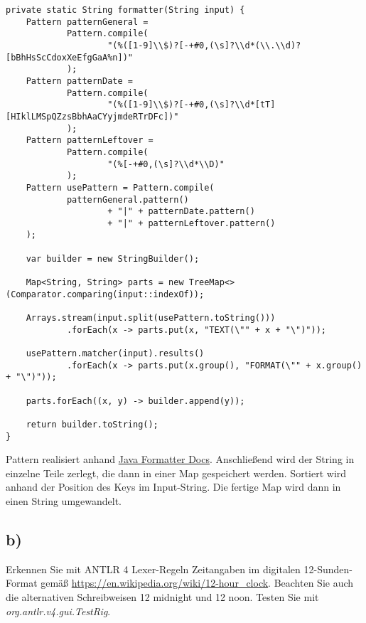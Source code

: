 \begin{lstlisting}[label={lst:Aufgabe1a}]
private static String formatter(String input) {
    Pattern patternGeneral =
            Pattern.compile(
                    "(%([1-9]\\$)?[-+#0,(\s]?\\d*(\\.\\d)?[bBhHsScCdoxXeEfgGaA%n])"
            );
    Pattern patternDate =
            Pattern.compile(
                    "(%([1-9]\\$)?[-+#0,(\s]?\\d*[tT][HIklLMSpQZzsBbhAaCYyjmdeRTrDFc])"
            );
    Pattern patternLeftover =
            Pattern.compile(
                    "(%[-+#0,(\s]?\\d*\\D)"
            );
    Pattern usePattern = Pattern.compile(
            patternGeneral.pattern()
                    + "|" + patternDate.pattern()
                    + "|" + patternLeftover.pattern()
    );

    var builder = new StringBuilder();

    Map<String, String> parts = new TreeMap<>(Comparator.comparing(input::indexOf));

    Arrays.stream(input.split(usePattern.toString()))
            .forEach(x -> parts.put(x, "TEXT(\"" + x + "\")"));

    usePattern.matcher(input).results()
            .forEach(x -> parts.put(x.group(), "FORMAT(\"" + x.group() + "\")"));

    parts.forEach((x, y) -> builder.append(y));

    return builder.toString();
}
\end{lstlisting}

Pattern realisiert anhand \href{https://docs.oracle.com/javase/7/docs/api/java/util/Formatter.html}{Java Formatter Docs}. \newline
Anschließend wird der String in einzelne Teile zerlegt, die dann in einer Map gespeichert werden.
Sortiert wird anhand der Position des Keys im Input-String. \newline
Die fertige Map wird dann in einen String umgewandelt. \newline

\newpage

\subsection*{b)}
Erkennen Sie mit ANTLR 4 Lexer-Regeln Zeitangaben im digitalen 12-Sunden-Format gemäß \url{https://en.wikipedia.org/wiki/12-hour_clock}.
Beachten Sie auch die alternativen Schreibweisen 12 midnight und 12 noon. Testen Sie mit \textit{org.antlr.v4.gui.TestRig}.

